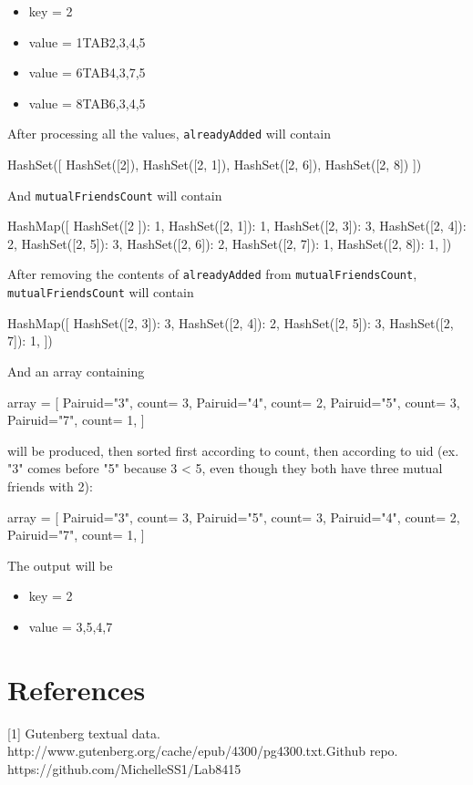 \documentclass[11pt]{article}
\begin{document}
\begin{justifying}
\begin{itemize}
    \item key \space \space \space = 2
    \item value = 1TAB2,3,4,5
    \item value = 6TAB4,3,7,5
    \item value = 8TAB6,3,4,5
\end{itemize}
After processing all the values, \verb|alreadyAdded| will contain
\begin{python}
HashSet([
    HashSet([2]),
    HashSet([2, 1]),
    HashSet([2, 6]),
    HashSet([2, 8])
])
\end{python}
And \verb|mutualFriendsCount| will contain
\begin{python}
HashMap([
    HashSet([2   ]): 1,
    HashSet([2, 1]): 1,
    HashSet([2, 3]): 3,
    HashSet([2, 4]): 2,
    HashSet([2, 5]): 3,
    HashSet([2, 6]): 2,
    HashSet([2, 7]): 1,
    HashSet([2, 8]): 1,
])
\end{python}
After removing the contents of \verb|alreadyAdded| from \verb|mutualFriendsCount|, \verb|mutualFriendsCount| will contain
\begin{python}
HashMap([
    HashSet([2, 3]): 3,
    HashSet([2, 4]): 2,
    HashSet([2, 5]): 3,
    HashSet([2, 7]): 1,
])
\end{python}
And an array containing
\begin{python}
array = [
    Pair{uid="3", count= 3},
    Pair{uid="4", count= 2},
    Pair{uid="5", count= 3},
    Pair{uid="7", count= 1},
]
\end{python}
will be produced, then sorted first according to count, then according to uid (ex. "3" comes before "5" because 3 < 5, even though they both have three mutual friends with 2):
\begin{python}
array = [
    Pair{uid="3", count= 3},
    Pair{uid="5", count= 3},
    Pair{uid="4", count= 2},
    Pair{uid="7", count= 1},
]
\end{python}
The output will be
\begin{itemize}
    \item key = 2
    \item value = 3,5,4,7
\end{itemize}
\end{justifying}
    
\section{References}
[1] Gutenberg textual data. http://www.gutenberg.org/cache/epub/4300/pg4300.txt.\newline
[2] Github repo. https://github.com/MichelleSS1/Lab8415
\end{document}
